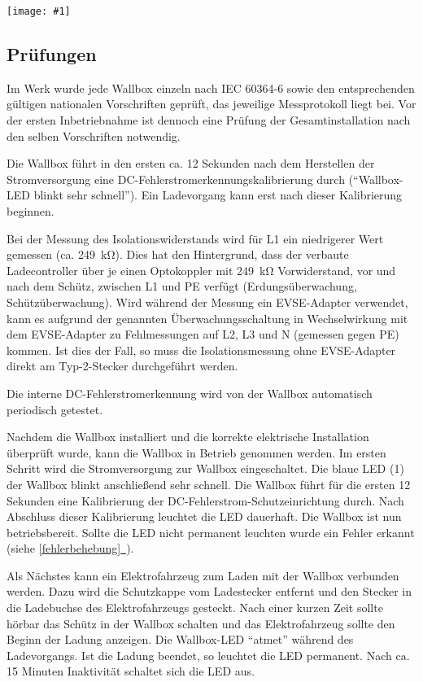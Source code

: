 \documentclass[a4paper,10pt]{article}
\newcommand{\gfx}[1]{\texttt{[image: \#1]}}
\newcommand*{\fullref}[1]{\hyperref[{#1}]{\ref*{#1}~\nameref*{#1}}}
\begin{document}
\begin{multicols*}{2}
	\gfx{./img_warp2/resized/warp2_ethernet4_600} %

	\subsection{Prüfungen}\label{tests}
	Im Werk wurde jede Wallbox einzeln nach IEC 60364-6 sowie den entsprechenden gültigen
	nationalen Vorschriften geprüft, das jeweilige Messprotokoll liegt bei.
	Vor der ersten Inbetriebnahme ist dennoch eine Prüfung der Gesamtinstallation
	nach den selben Vorschriften notwendig.

	Die Wallbox führt in den ersten ca. 12 Sekunden nach dem Herstellen der Stromversorgung
	eine DC-Fehlerstromerkennungskalibrierung durch (\enquote{Wallbox-LED blinkt sehr schnell}).
	Ein Ladevorgang kann erst nach dieser Kalibrierung beginnen.

	Bei der Messung des Isolationswiderstands wird für L1 ein niedrigerer Wert
	gemessen (ca. \SI{249}{\kilo\ohm}). Dies hat den Hintergrund, dass
	der verbaute Ladecontroller über je einen Optokoppler mit
	\SI{249}{\kilo\ohm} Vorwiderstand, vor und nach dem Schütz, zwischen L1 und
	PE verfügt (Erdungsüberwachung, Schützüberwachung). Wird während der Messung ein EVSE-Adapter verwendet,
	kann es aufgrund der genannten Überwachungsschaltung in Wechselwirkung mit dem EVSE-Adapter zu Fehlmessungen
	auf L2, L3 und N (gemessen gegen PE) kommen. Ist dies der Fall, so muss die Isolationsmessung
	ohne EVSE-Adapter direkt am Typ-2-Stecker durchgeführt werden.

	Die interne DC-Fehlerstromerkennung wird von der Wallbox automatisch
	periodisch getestet.

	Nachdem die Wallbox installiert
	und die korrekte elektrische Installation überprüft wurde, kann die Wallbox in
	Betrieb genommen werden.
	Im ersten Schritt wird die Stromversorgung zur Wallbox eingeschaltet. Die
	blaue LED (1) der Wallbox blinkt anschließend sehr schnell. Die Wallbox führt
	für die ersten 12 Sekunden eine Kalibrierung der
	DC-Fehlerstrom-Schutzeinrichtung durch. Nach Abschluss dieser Kalibrierung
	leuchtet die LED dauerhaft. Die Wallbox ist nun betriebsbereit. Sollte die LED
	nicht permanent leuchten wurde ein Fehler erkannt (siehe \fullref{fehlerbehebung}).

	Als Nächstes kann ein Elektrofahrzeug zum Laden mit der Wallbox verbunden
	werden. Dazu wird die Schutzkappe vom Ladestecker entfernt und den Stecker in die
	Ladebuchse des Elektrofahrzeugs gesteckt. Nach einer kurzen Zeit sollte hörbar
	das Schütz in der Wallbox schalten und das Elektrofahrzeug sollte den Beginn
	der Ladung anzeigen. Die Wallbox-LED \enquote{atmet} während des
	Ladevorgangs. Ist die Ladung beendet, so leuchtet die LED permanent. Nach ca.
	15 Minuten Inaktivität schaltet sich die LED aus.


\end{multicols*}
\end{document}
